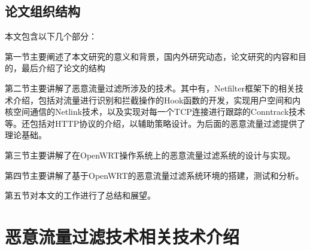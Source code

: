 \documentclass[a4paper,onecolumn,UTF8]{ctexart}
\begin{document}
\subsection{论文组织结构}
本文包含以下几个部分：
\par 第一节主要阐述了本文研究的意义和背景，国内外研究动态，论文研究的内容和目的，最后介绍了论文的结构
\par 第二节主要讲解了恶意流量过滤所涉及的技术。其中有，Netfilter框架下的相关技术介绍，包括对流量进行识别和拦截操作的Hook函数的开发，实现用户空间和内核空间通信的Netlink技术，以及实现对每一个TCP连接进行跟踪的Conntrack技术等。还包括对HTTP协议的介绍，以辅助策略设计。为后面的恶意流量过滤提供了理论基础。
\par 第三节主要讲解了在OpenWRT操作系统上的恶意流量过滤系统的设计与实现。
\par 第四节主要讲解了基于OpenWRT的恶意流量过滤系统环境的搭建，测试和分析。
\par 第五节对本文的工作进行了总结和展望。
\section{恶意流量过滤技术相关技术介绍}
\end{document}
